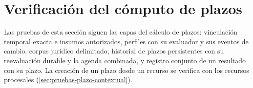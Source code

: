 
\section{Verificación del cómputo de plazos}\label{sec:pruebas-plazos}

Las pruebas de esta sección siguen las capas del cálculo de plazos: vinculación temporal exacta e insumos autorizados, perfiles con su evaluador y sus eventos de cambio, corpus jurídico delimitado, historial de plazos persistentes con su reevaluación durable y la agenda combinada, y registro conjunto de un resultado con su plazo. La creación de un plazo desde un recurso se verifica con los recursos procesales (\cref{sec:pruebas-plazo-contextual}).










